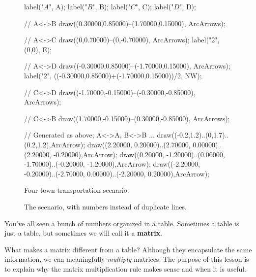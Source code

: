 \documentclass[../textbook.tex]{subfiles}
\begin{document}
\begin{figure}[h]
\begin{center}
\begin{minipage}[b]{0.45\textwidth}
\begin{asy}[width=0.7\textwidth]
				label("$A$", A);
				label("$B$", B);
				label("$C$", C);
				label("$D$", D);

				// A<->B
				draw((0.30000,0.85000)--(1.70000,0.15000), ArcArrows);

				// A<->C
				draw((0,0.70000)--(0,-0.70000), ArcArrows);
				label("$2$", (0,0), E);

				// A<->D
				draw((-0.30000,0.85000)--(-1.70000,0.15000), ArcArrows);
				label("$2$", ((-0.30000,0.85000)+(-1.70000,0.15000))/2, NW);

				// C<->D
				draw((-1.70000,-0.15000)--(-0.30000,-0.85000), ArcArrows);

				// C<->B
				draw((1.70000,-0.15000)--(0.30000,-0.85000), ArcArrows);

				// Generated as above; A<->A, B<->B ...
				draw((-0.2,1.2)..(0,1.7)..(0.2,1.2),ArcArrow);
				draw((2.20000, 0.20000)..(2.70000, 0.00000)..(2.20000, -0.20000),ArcArrow);
				draw((0.20000, -1.20000)..(0.00000, -1.70000)..(-0.20000, -1.20000),ArcArrow);
				draw((-2.20000, -0.20000)..(-2.70000, 0.00000)..(-2.20000, 0.20000),ArcArrow);
			\end{asy}
		\end{minipage}
	\end{center}
	\vspace*{-2\baselineskip}
	\begin{center}
		\begin{minipage}[t]{0.45\textwidth}
			\caption{Four town transportation scenario.}
			\label{fig:four_town_scenario}
		\end{minipage}
		\hfill
		\begin{minipage}[t]{0.45\textwidth}
			\caption{The scenario, with numbers instead of duplicate lines.}
			\label{fig:scenario_with_nums}
		\end{minipage}
	\end{center}
	\vspace*{-2\baselineskip}
\end{figure}

\noindent You've all seen a bunch of numbers organized in a table. Sometimes a table is just a table, but sometimes we will call it a \textbf{matrix}.

What makes a matrix different from a table? Although they encapsulate the same information, we can meaningfully \textit{multiply} matrices. The purpose of this lesson is to explain why the matrix multiplication rule makes sense and when it is useful.
\end{document}
